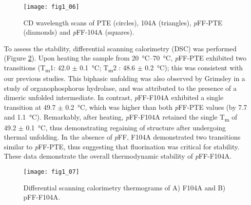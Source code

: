\begin{refsection}
\begin{figure}[h!] \centering \texttt{[image: fig1\_06]}
    \caption[CD wavelength scans of PTE (circles), 104A (triangles),
    \emph{p}FF-PTE (diamonds) and \emph{p}FF-104A (squares).]{CD wavelength
        scans of PTE (circles), 104A (triangles), \emph{p}FF-PTE (diamonds) and
        \emph{p}FF-104A (squares).} \label{fig:CD-fig} 
\end{figure}
To assess the stability, differential scanning calorimetry (DSC) was performed
(Figure \ref{fig:DSC-fig}). Upon heating the sample from \SIrange{20}{70}{\celsius},
\emph{p}FF-PTE exhibited two transitions (T\textsubscript{m}1: 42.0 $\pm$
\SI{0.1}{\celsius}; T\textsubscript{m}2 : 48.6 $\pm$ \SI{0.2}{\celsius}); this
was consistent with our previous studies\cite{Baker2011b}. This biphasic
unfolding was also observed by Grimsley   in a study of
organophosphorus hydrolase, and was attributed to the presence of a dimeric
unfolded intermediate\cite{Grimsley1997b}. In contrast, \emph{p}FF-F104A
exhibited a single transition at 49.7 $\pm$ \SI{0.2}{\celsius}, which was
higher than both \emph{p}FF-PTE values (by 7.7 and \SI{1.1}{\celsius}).
Remarkably, after heating, \emph{p}FF-F104A retained the single
T\textsubscript{m} of 49.2 $\pm$ \SI{0.1}{\celsius}, thus demonstrating
regaining of structure after undergoing thermal unfolding.  In the absence of
\emph{p}FF, F104A demonstrated two transitions similar to \emph{p}FF-PTE, thus
suggesting that fluorination was critical for stability.  These data
demonstrate the overall thermodynamic stability of \emph{p}FF-F104A.
\begin{figure}[h!] \centering \texttt{[image: fig1\_07]}
    \caption[Differential scanning calorimetry thermograms of (A) F104A and (B)
    \emph{p}FF-F104A.]{Differential scanning calorimetry thermograms of A)
    F104A and B) pFF-F104A.} \label{fig:DSC-fig} 
\end{figure}


\end{refsection}
